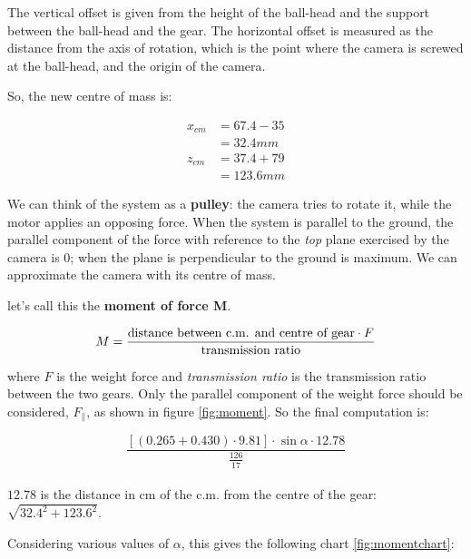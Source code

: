 \documentclass[]{article}
\begin{document}
The vertical offset is given from the height of the ball-head and the support between the ball-head and the gear. The horizontal offset is measured as the distance from the axis of rotation, which is the point where the camera is screwed at the ball-head, and the origin of the camera. 

So, the new centre of mass is:

\begin{align*}
	x_{cm} & = 67.4 - 35 \\
		   & = 32.4 mm \\
	z_{cm} & = 37.4 + 79 \\
		   & = 123.6 mm
\end{align*}

We can think of the system as a \textbf{pulley}: the camera tries to rotate it, while the motor applies an opposing force. When the system is parallel to the ground, the parallel component of the force with reference to the \textit{top} plane exercised by the camera is $0$; when the plane is perpendicular to the ground is maximum. We can approximate the camera with its centre of mass.

let's call this the \textbf{moment of force M}.

$$ M = \frac{\textnormal{distance between c.m. and centre of gear} \cdot F}{\textnormal{transmission  ratio}}$$

where $F$ is the weight force and \textit{transmission ratio} is the transmission ratio between the two gears. Only the parallel component of the weight force should be considered, $F_{\parallel}$, as shown in figure \ref{fig:moment}. So the final computation is:

$$ \frac{ \left[ (0.265 + 0.430)\cdot 9.81 \right] \cdot \sin\alpha \cdot 12.78}{\frac{126}{17}}$$
\\
$12.78$ is the distance in cm of the c.m. from the centre of the gear: $\sqrt{32.4^2 + 123.6^2}$. 

Considering various values of $\alpha$, this gives the following chart \ref{fig:momentchart}:
\end{document}

